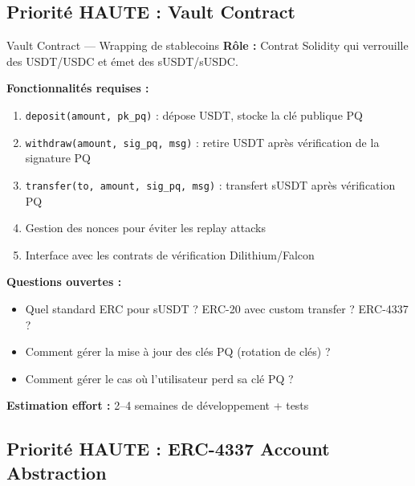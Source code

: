 \documentclass[12pt, a4paper]{article}
\begin{document}
\subsection{Priorité HAUTE : Vault Contract}

\begin{todo}{Vault Contract --- Wrapping de stablecoins}
\textbf{Rôle :} Contrat Solidity qui verrouille des USDT/USDC et émet des sUSDT/sUSDC.

\textbf{Fonctionnalités requises :}
\begin{enumerate}
  \item \texttt{deposit(amount, pk\_pq)} : dépose USDT, stocke la clé publique PQ
  \item \texttt{withdraw(amount, sig\_pq, msg)} : retire USDT après vérification de la signature PQ
  \item \texttt{transfer(to, amount, sig\_pq, msg)} : transfert sUSDT après vérification PQ
  \item Gestion des nonces pour éviter les replay attacks
  \item Interface avec les contrats de vérification Dilithium/Falcon
\end{enumerate}

\textbf{Questions ouvertes :}
\begin{itemize}
  \item Quel standard ERC pour sUSDT ? ERC-20 avec custom transfer ? ERC-4337 ?
  \item Comment gérer la mise à jour des clés PQ (rotation de clés) ?
  \item Comment gérer le cas où l'utilisateur perd sa clé PQ ?
\end{itemize}

\textbf{Estimation effort :} 2--4 semaines de développement + tests
\end{todo}

\subsection{Priorité HAUTE : ERC-4337 Account Abstraction}
\end{document}
